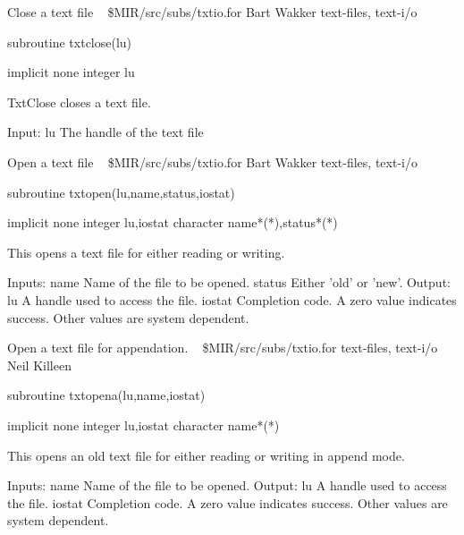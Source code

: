 %
\noindent Close a text file
\newline \ 
\newline {} \$MIR/src/subs/txtio.for
\newline {} Bart Wakker
\newline {} text-files, text-i/o
\par{\tenpoint
{\eightpoint\begintt
        subroutine txtclose(lu)

        implicit none
        integer lu

  TxtClose closes a text file.

  Input:
    lu         The handle of the text file
\endtt}
\par}
%
\noindent Open a text file
\newline \ 
\newline {} \$MIR/src/subs/txtio.for
\newline {} Bart Wakker
\newline \abox{Keywords:} text-files, text-i/o
\par{\tenpoint
{\eightpoint\begintt
        subroutine txtopen(lu,name,status,iostat)

        implicit none
        integer lu,iostat
        character name*(*),status*(*)

  This opens a text file for either reading or writing.

  Inputs:
    name       Name of the file to be opened.
    status     Either 'old' or 'new'.
  Output:
    lu         A handle used to access the file.
    iostat     Completion code. A zero value indicates success. Other
               values are system dependent.
\endtt}
\par}
%
\noindent Open a text file for appendation.
\newline \ 
\newline {} \$MIR/src/subs/txtio.for
\newline \abox{Keywords:} text-files, text-i/o
\newline {} Neil Killeen
\par{\tenpoint
{\eightpoint\begintt
        subroutine txtopena(lu,name,iostat)

        implicit none
        integer lu,iostat
        character name*(*)

  This opens an old text file for either reading or writing in append
  mode.

  Inputs:
    name       Name of the file to be opened.
  Output:
    lu         A handle used to access the file.
    iostat     Completion code. A zero value indicates success. Other
               values are system dependent.  
\endtt}
\par}
